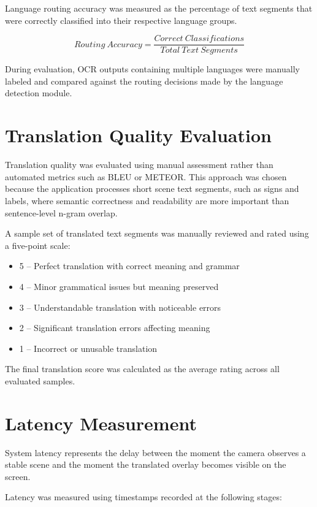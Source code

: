 Language routing accuracy was measured as the percentage of text segments that were correctly classified into their respective language groups.

\begin{equation}
Routing\ Accuracy = \frac{Correct\ Classifications}{Total\ Text\ Segments}
\end{equation}

During evaluation, OCR outputs containing multiple languages were manually labeled and compared against the routing decisions made by the language detection module.

\section{Translation Quality Evaluation}

Translation quality was evaluated using manual assessment rather than automated metrics such as BLEU or METEOR. This approach was chosen because the application processes short scene text segments, such as signs and labels, where semantic correctness and readability are more important than sentence-level n-gram overlap.

A sample set of translated text segments was manually reviewed and rated using a five-point scale:

\begin{itemize}
\item 5 – Perfect translation with correct meaning and grammar
\item 4 – Minor grammatical issues but meaning preserved
\item 3 – Understandable translation with noticeable errors
\item 2 – Significant translation errors affecting meaning
\item 1 – Incorrect or unusable translation
\end{itemize}

The final translation score was calculated as the average rating across all evaluated samples.

\section{Latency Measurement}

System latency represents the delay between the moment the camera observes a stable scene and the moment the translated overlay becomes visible on the screen.

Latency was measured using timestamps recorded at the following stages:

